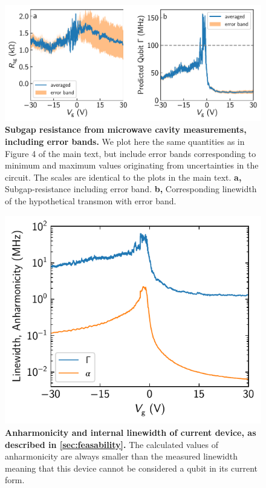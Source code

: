 \begin{figure}[]
	\centering
	\includegraphics[width=\linewidth]{chapter-gJJ/figs/fig4_supp_bands}
	\caption[]{\textbf{Subgap resistance from microwave cavity measurements, including error bands.}
		We plot here the same quantities as in Figure 4 of the main text, but include error bands corresponding to minimum and maximum values originating from uncertainties in the circuit.
		The scales are identical to the plots in the main text.
		\textbf{a,} Subgap-resistance including error band.
		\textbf{b,} Corresponding linewidth of the hypothetical transmon with error band.
	}
	\label{fig:figure4_bands}
\end{figure}

\begin{figure}[]
	\centering
	\includegraphics[width=.7\linewidth]{chapter-gJJ/figs/supp_anharmonicity_1.pdf}
	\caption{{\bf Anharmonicity and internal linewidth of current device, as described in \ref{sec:feasability}.}
		The calculated values of anharmonicity are always smaller than the measured linewidth meaning that this device cannot be considered a qubit in its current form.}
	\label{fig:anharm1}
\end{figure}

